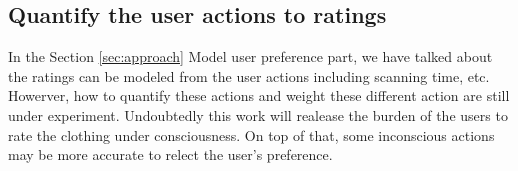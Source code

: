 \subsection{Quantify the user actions to ratings}
In the Section \ref{sec:approach} Model user preference part, we have talked about the ratings can be modeled from the user actions including scanning time, etc. Howerver, how to quantify these actions and weight these different action are still under experiment. Undoubtedly this work will realease the burden of the users to rate the clothing under consciousness. On top of that, some inconscious actions may be more accurate to relect the user's preference.

